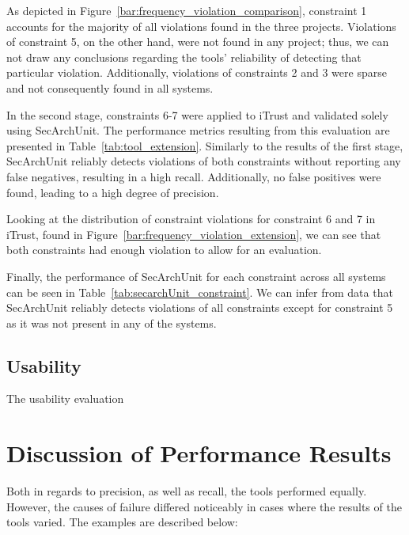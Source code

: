 As depicted in Figure~\ref{bar:frequency_violation_comparison}, constraint 1 accounts for the majority of all violations found in the three projects. Violations of constraint 5, on the other hand, were not found in any project; thus, we can not draw any conclusions regarding the tools' reliability of detecting that particular violation. Additionally, violations of constraints 2 and 3 were sparse and not consequently found in all systems.



In the second stage, constraints 6-7 were applied to iTrust and validated solely using SecArchUnit. The performance metrics resulting from this evaluation are presented in Table~\ref{tab:tool_extension}. Similarly to the results of the first stage, SecArchUnit reliably detects violations of both constraints without reporting any false negatives, resulting in a high recall.  Additionally, no false positives were found, leading to a high degree of precision.



Looking at the distribution of constraint violations for constraint 6 and 7 in iTrust, found in Figure~\ref{bar:frequency_violation_extension}, we can see that both constraints had enough violation to allow for an evaluation. 



Finally, the performance of SecArchUnit for each constraint across all systems can be seen in Table~\ref{tab:secarchUnit_constraint}. We can infer from data that SecArchUnit reliably detects violations of all constraints except for constraint 5 as it was not present in any of the systems. 



\subsection{Usability}
The usability evaluation 



%



\clearpage
\section{Discussion of Performance Results}
Both in regards to precision, as well as recall, the tools performed equally. However, the causes of failure differed noticeably in cases where the results of the tools varied. The examples are described below:

